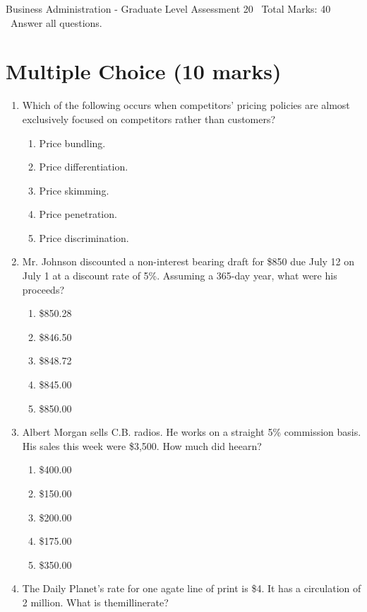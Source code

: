 \documentclass[12pt]{article}
\begin{document}
\begin{center}
Business Administration - Graduate Level Assessment 20 \
Total Marks: 40 \
Answer all questions.
\end{center}

\section*{Multiple Choice (10 marks)}
\begin{enumerate}[label=\arabic*.]
\item Which of the following occurs when competitors' pricing policies are almost exclusively focused on competitors rather than customers?
\begin{enumerate}[label=(\alph*)]
    \item Price bundling.
    \item Price differentiation.
    \item Price skimming.
    \item Price penetration.
    \item Price discrimination.
\end{enumerate}
\item Mr. Johnson discounted a non-interest bearing draft for \$850 due July 12 on July 1 at a discount rate of 5\%. Assuming a 365-day year, what were his proceeds?
\begin{enumerate}[label=(\alph*)]
    \item \$850.28
    \item \$846.50
    \item \$848.72
    \item \$845.00
    \item \$850.00
\end{enumerate}
\item Albert Morgan sells C.B. radios. He works on a straight 5\% commission basis. His sales this week were \$3,500. How much did heearn?
\begin{enumerate}[label=(\alph*)]
    \item \$400.00
    \item \$150.00
    \item \$200.00
    \item \$175.00
    \item \$350.00
\end{enumerate}
\item The Daily Planet's rate for one agate line of print is \$4. It has a circulation of 2 million. What is themillinerate?
\begin{enumerate}[label=(\alph*)]

\end{enumerate}
\end{enumerate}
\end{document}
